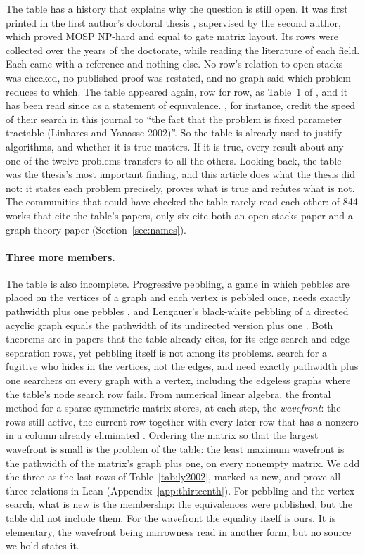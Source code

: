 The table has a history that explains why the question is still open. It was
first printed in the first author's doctoral thesis
\citep[Table~2.1, p.~13]{Linhares2001}, supervised by the second author, which proved MOSP
NP-hard and equal to gate matrix layout. Its rows were collected over the years
of the doctorate, while reading the literature of each field. Each came with a
reference and nothing else. No row's relation to open stacks was checked, no
published proof was restated, and no graph said which problem reduces to which.
The table appeared again, row for row, as Table~1 of \citet{LY2002}, and it has
been read since as a statement of equivalence.
\citet{GarciaDeLaBandaStuckey2007}, for instance, credit the speed of their
search in this journal to ``the fact that the problem is fixed parameter
tractable (Linhares and Yanasse 2002)''. So the table is already used to
justify algorithms, and whether it is true matters. If it is true, every result
about any one of the twelve problems transfers to all the others. Looking back,
the table was the thesis's most important finding, and this article does what
the thesis did not: it states each problem precisely, proves what is true and
refutes what is not. The communities that could have checked the table
rarely read each other: of 844 works that cite the table's papers,
only six cite both an open-stacks paper and a graph-theory paper
(Section~\ref{sec:names}).

\paragraph{Three more members.} The table is also incomplete. Progressive
pebbling, a game in which pebbles are placed on the vertices of a graph and
each vertex is pebbled once, needs exactly pathwidth plus one pebbles
\citep[Thm~3.1]{LY2002ref10}, and Lengauer's black-white pebbling of a
directed acyclic graph equals the pathwidth of its undirected version plus one
\citep[Thm~2]{LY2002ref14}. Both theorems are in papers that the table
already cites, for its edge-search and edge-separation rows, yet pebbling
itself is not among its problems. \citet[(5.1)]{BRST1991} search for a fugitive
who hides in the vertices, not the edges, and need exactly pathwidth plus one
searchers on every graph with a vertex, including the edgeless graphs where the
table's node search row fails. From numerical linear algebra, the frontal method for a
sparse symmetric matrix stores, at each step, the \emph{wavefront}: the rows
still active, the current row together with every later row that has a nonzero
in a column already eliminated \citep[\S2.1]{KumfertPothen1997}. Ordering the
matrix so that the largest wavefront is small is the problem of the table: the
least maximum wavefront is the pathwidth of the matrix's graph plus one, on
every nonempty matrix. We add the three as the last rows of
Table~\ref{tab:ly2002}, marked as new, and prove all three relations in Lean
(Appendix~\ref{app:thirteenth}). For pebbling and the vertex
search, what is new is the membership: the equivalences were published, but
the table did not include them. For the wavefront the equality itself is ours.
It is elementary, the wavefront being narrowness read in another form, but no
source we hold states it.

